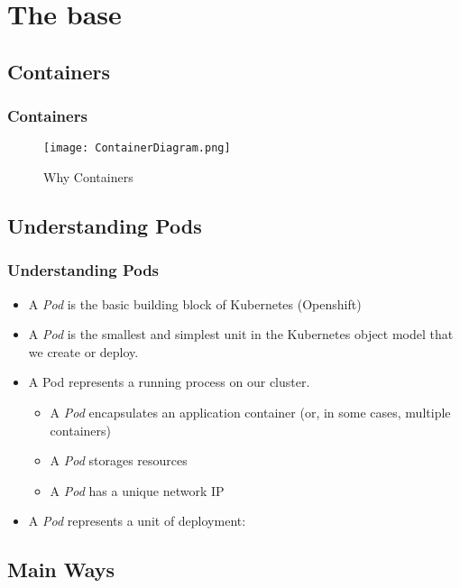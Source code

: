 
\section{The base}

\subsection{Containers}

\begin{frame}[fragile]
  \frametitle{Containers}
\begin{figure}[ht]
  \caption{Why Containers}
  \centering
  \texttt{[image: ContainerDiagram.png]}
  \label{fig:ContainerDiagram}
\end{figure}
\end{frame}

\subsection{Understanding Pods}

\begin{frame}
  \frametitle{Understanding Pods}
  \begin{itemize}
  \item<1->A \emph{Pod} is the basic building block of Kubernetes (Openshift)
  \item<2->A \emph{Pod} is the smallest and simplest unit in the Kubernetes object model that we create or deploy.
  \item<3->A Pod represents a running process on our cluster.
    \begin{itemize}
    \item<4->A \emph{Pod} encapsulates an application container (or, in some cases, multiple containers)
    \item<5->A \emph{Pod} storages resources
    \item<6->A \emph{Pod} has a unique network IP
    \end{itemize}
  \item<7->A \emph{Pod} represents a unit of deployment:
  \end{itemize}
\end{frame}

\subsection{Main Ways}

